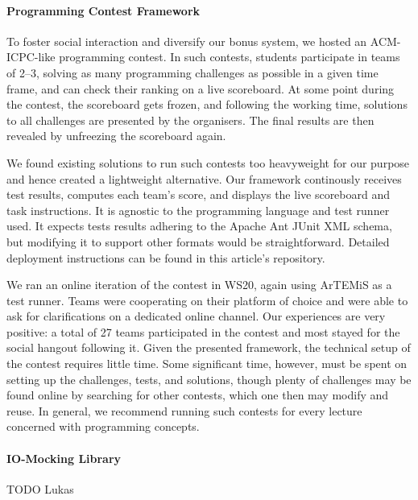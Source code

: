 \paragraph{Programming Contest Framework}\label{sec:contest}
To foster social interaction and diversify our bonus system,
we hosted an ACM-ICPC-like programming contest.
In such contests, students
participate in teams of 2--3,
solving as many programming challenges as possible in a given time frame,
and can check their ranking on a live scoreboard.
At some point during the contest,
the scoreboard gets frozen,
and following the working time,
solutions to all challenges are presented by the organisers.
The final results are then revealed by unfreezing the scoreboard again.

We found existing solutions
to run such contests too heavyweight for our purpose
and hence created a lightweight alternative.
Our framework continously receives test results,
computes each team's score,
and displays the live scoreboard and task instructions.
It is agnostic to the programming language and test runner used.
It expects tests results adhering to the Apache Ant JUnit XML schema,
but modifying it to support other formats would be straightforward.
Detailed deployment instructions can be found in this article's repository.

We ran an online iteration of the contest in WS20,
again using ArTEMiS as a test runner.
Teams were cooperating on their platform of choice
and were able to ask for clarifications on a dedicated online channel.
Our experiences are very positive:
a total of 27 teams participated in the contest
and most stayed for the social hangout following it.
Given the presented framework,
the technical setup of the contest requires little time.
Some significant time, however,
must be spent on setting up the challenges,
tests, and solutions,
though plenty of challenges may be found
online by searching for other contests,
which one then may modify and reuse.
In general, we recommend running such contests
for every lecture concerned with programming concepts.


\paragraph{IO-Mocking Library}
TODO Lukas

